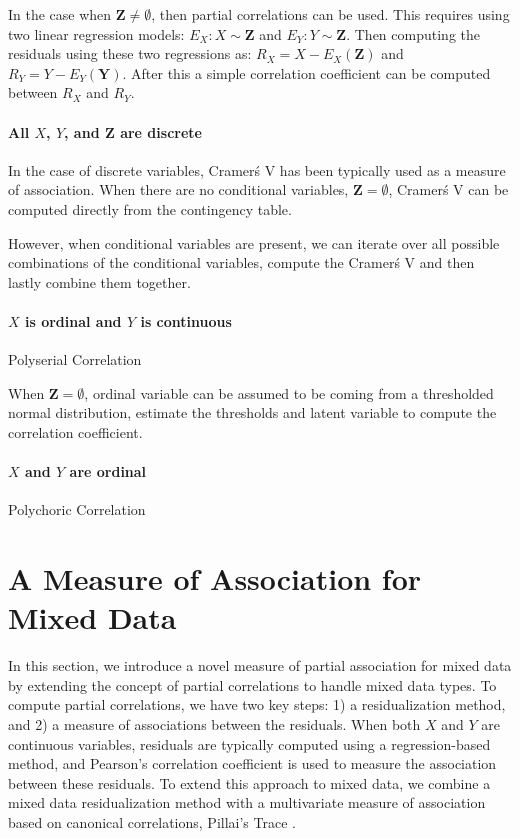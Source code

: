 \documentclass{uai2025} %
\begin{document}
In the case when $ \bm{Z} \neq \emptyset $, then partial correlations can be
used. This requires using two linear regression models: $ E_X: X \sim \bm{Z} $
and $ E_Y: Y \sim \bm{Z} $. Then computing the residuals using these two
regressions as: $ R_X = X - E_X(\bm{Z}) $ and $ R_Y = Y - E_Y(\bm{Y}) $. After
this a simple correlation coefficient can be computed between $ R_X $ and $ R_Y $.

\paragraph{All $ X $, $ Y $, and $ \bm{Z} $ are discrete}

In the case of discrete variables, Cramer\'s V has been typically used as a
measure of association. When there are no conditional variables, $ \bm{Z} = \emptyset $,
Cramer\'s V can be computed directly from the contingency table.

However, when conditional variables are present, we can iterate over all
possible combinations of the conditional variables, compute the Cramer\'s V and
then lastly combine them together. 

\paragraph{$ X $ is ordinal and $ Y $ is continuous}
Polyserial Correlation

When $ \bm{Z} = \emptyset $, ordinal variable can be assumed to be coming from
a thresholded normal distribution, estimate the thresholds and latent variable
to compute the correlation coefficient.

\paragraph{$ X $ and $ Y $ are ordinal}
Polychoric Correlation

\section{A Measure of Association for Mixed Data}
\label{sec:mixed_association}

In this section, we introduce a novel measure of partial association for mixed
data by extending the concept of partial correlations \citep{Whittaker2009}
 to handle mixed data types. To compute partial
correlations, we have two key steps: 1) a residualization method, and 2) a
measure of associations between the residuals. When both $ X $ and $ Y $ are
continuous variables, residuals are typically computed using a regression-based
method, and Pearson's correlation coefficient is used to measure the association
between these residuals. To extend this approach to mixed data, we combine a mixed
data residualization method \citep{Ankan2023} with a multivariate measure of
association based on canonical correlations, Pillai's Trace \citep{Pillai1955}. 
\end{document}
